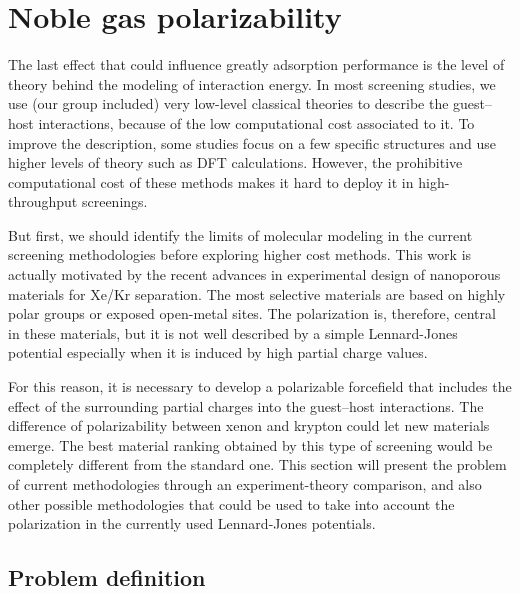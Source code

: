 \documentclass[main]{subfiles}
\begin{document}
\section{Noble gas polarizability}

The last effect that could influence greatly adsorption performance is the level of theory behind the modeling of interaction energy. In most screening studies, we use (our group included) very low-level classical theories to describe the guest--host interactions, because of the low computational cost associated to it. To improve the description, some studies focus on a few specific structures and use higher levels of theory such as DFT calculations. However, the prohibitive computational cost of these methods makes it hard to deploy it in high-throughput screenings. 

But first, we should identify the limits of molecular modeling in the current screening methodologies before exploring higher cost methods. This work is actually motivated by the recent advances in experimental design of nanoporous materials for Xe/Kr separation. The most selective materials are based on highly polar groups or exposed open-metal sites.\autocite{Li_2019,Pei_2022} The polarization is, therefore, central in these materials, but it is not well described by a simple Lennard-Jones potential especially when it is induced by high partial charge values. 

For this reason, it is necessary to develop a polarizable forcefield that includes the effect of the surrounding partial charges into the guest--host interactions. The difference of polarizability between xenon and krypton could let new materials emerge. The best material ranking obtained by this type of screening would be completely different from the standard one. This section will present the problem of current methodologies through an experiment-theory comparison, and also other possible methodologies that could be used to take into account the polarization in the currently used Lennard-Jones potentials.

\subsection{Problem definition}
\end{document}
